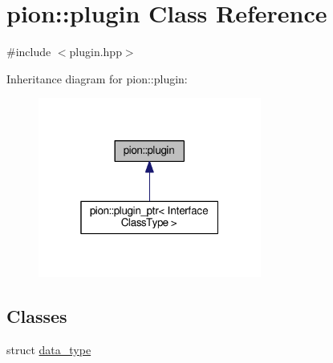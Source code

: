 \hypertarget{classpion_1_1plugin}{\section{pion\-:\-:plugin Class Reference}
\label{classpion_1_1plugin}
}


{\ttfamily \#include $<$plugin.\-hpp$>$}



Inheritance diagram for pion\-:\-:plugin\-:
\nopagebreak
\begin{figure}[H]
\begin{center}
\leavevmode
\includegraphics[width=208pt]{classpion_1_1plugin__inherit__graph}
\end{center}
\end{figure}
\subsection*{Classes}
\begin{DoxyCompactItemize}
\item 
struct \hyperlink{structpion_1_1plugin_1_1data__type}{data\-\_\-type}
\end{DoxyCompactItemize}
